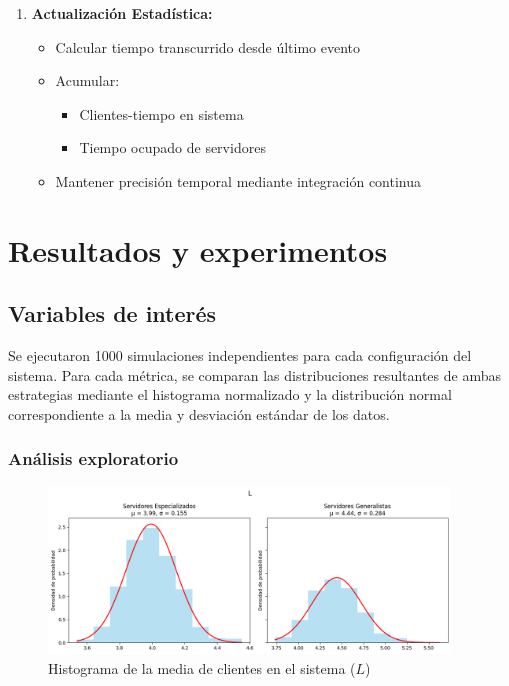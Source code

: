 \documentclass[letterpaper, 12pt]{report}
\begin{document}
\begin{enumerate}[leftmargin=1.5cm]
    \item \textbf{Actualización Estadística:}
    \begin{itemize}
        \item Calcular tiempo transcurrido desde último evento
        \item Acumular:
        \begin{itemize}
            \item Clientes-tiempo en sistema
            \item Tiempo ocupado de servidores
        \end{itemize}
        \item Mantener precisión temporal mediante integración continua
    \end{itemize}
    

\end{enumerate}

\chapter{Resultados y experimentos}

\section{Variables de interés}

Se ejecutaron 1000 simulaciones independientes para cada configuración del sistema. Para cada métrica, se comparan las distribuciones resultantes de ambas estrategias mediante el histograma normalizado y la distribución normal correspondiente a la media y desviación estándar de los datos.

\subsection{Análisis exploratorio}

\begin{figure}[H]
    \centering
    \includegraphics[width=0.95\textwidth]{images/L.png}
    \caption{Histograma de la media de clientes en el sistema ($L$)}
    \label{fig:clientes}
\end{figure}
\end{document}

